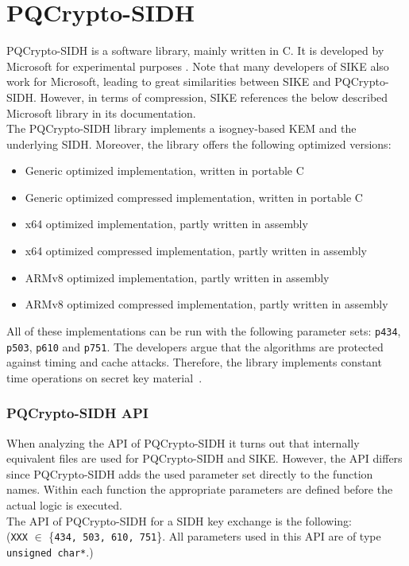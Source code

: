 \section{\gls{PQCrypto-SIDH}}
\gls{PQCrypto-SIDH} is a software library, mainly written in C. It is developed by Microsoft for experimental purposes \parencite{microsoft2020sidh}. Note that many developers of \gls{SIKE} also work for Microsoft, leading to great similarities between \gls{SIKE} and \gls{PQCrypto-SIDH}. However, in terms of compression, \gls{SIKE} references the below described Microsoft library in its documentation.\\
The \gls{PQCrypto-SIDH} library implements a isogney-based \gls{KEM} and the underlying \gls{SIDH}. Moreover, the library offers the following optimized versions:
\begin{itemize}
  \item Generic optimized implementation, written in portable C
  \item Generic optimized compressed implementation, written in portable C
  \item x64 optimized implementation, partly written in assembly
  \item x64 optimized compressed implementation, partly written in assembly
  \item ARMv8 optimized implementation, partly written in assembly
  \item ARMv8 optimized compressed implementation, partly written in assembly
\end{itemize}
All of these implementations can be run with the following parameter sets: \texttt{p434}, \texttt{p503}, \texttt{p610} and \texttt{p751}. The developers argue that the algorithms are protected against timing and cache attacks. Therefore, the library implements constant time operations on secret key material~\parencite{microsoft2020sidh}.
\subsubsection{\gls{PQCrypto-SIDH} API}

When analyzing the API of \gls{PQCrypto-SIDH} it turns out that internally equivalent files are used for \gls{PQCrypto-SIDH} and \gls{SIKE}. However, the API differs since \gls{PQCrypto-SIDH} adds the used parameter set directly to the function names. Within each function the appropriate parameters are defined before the actual logic is executed.\\
The API of \gls{PQCrypto-SIDH} for a \gls{SIDH} key exchange is the following:\\ (\texttt{XXX} $\in$ \{\texttt{434, 503, 610, 751}\}. All parameters used in this API are of type \texttt{unsigned char*}.)

